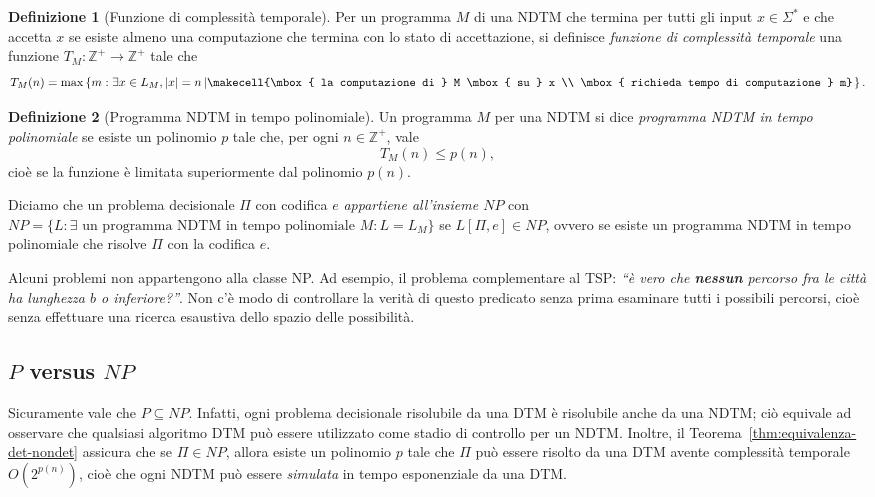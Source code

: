 \documentclass[10pt]{\classname}
\theoremstyle{newlinethm}
\theoremstyle{theorem}
\theoremstyle{definition}
\newtheorem{definizione}{Definizione}[section]
\theoremstyle{definition}
\theoremstyle{definition}
\theoremstyle{definition}
\begin{document}
\begin{definizione}[Funzione di complessità temporale]
    Per un programma $M$ di una NDTM che termina per tutti gli input $x \in \Sigma^*$ e che accetta $x$ se esiste almeno una computazione che termina con lo stato di accettazione, si definisce \emph{funzione di complessità temporale} una funzione $T_M : \mathbb Z^+ \rightarrow \mathbb Z^+$ tale che \[T_M(n) = \max \left\{m : \exists x \in L_M, |x| = n \left|\makecell{\mbox{ la computazione di } M \mbox{ su } x \\ \mbox{ richieda tempo di computazione } m}\right.\right\}.\]
\end{definizione}

\begin{definizione}[Programma NDTM in tempo polinomiale]
    Un programma $M$ per una NDTM si dice \emph{programma NDTM in tempo polinomiale} se esiste un polinomio $p$ tale che, per ogni $n \in \mathbb Z^+$, vale \[T_M(n) \leq p(n),\] cioè se la funzione è limitata superiormente dal polinomio $p(n)$.

    Diciamo che un problema decisionale $\Pi$ con codifica $e$ \emph{appartiene all'insieme $NP$} con $NP = \{L : \exists \mbox{ un programma NDTM in tempo polinomiale } M : L=L_M\}$ se $L[\Pi, e] \in NP$, ovvero se esiste un programma NDTM in tempo polinomiale che risolve $\Pi$ con la codifica $e$.
\end{definizione}

Alcuni problemi non appartengono alla classe NP. Ad esempio, il problema complementare al TSP: \emph{``è vero che \textbf{nessun} percorso fra le città ha lunghezza $b$ o inferiore?''}. Non c'è modo di controllare la verità di questo predicato senza prima esaminare tutti i possibili percorsi, cioè senza effettuare una ricerca esaustiva dello spazio delle possibilità.

\subsection{$P$ versus $NP$}

Sicuramente vale che $P \subseteq NP$. Infatti, ogni problema decisionale risolubile da una DTM è risolubile anche da una NDTM; ciò equivale ad osservare che qualsiasi algoritmo DTM può essere utilizzato come stadio di controllo per un NDTM. Inoltre, il Teorema~\ref{thm:equivalenza-det-nondet} assicura che se $\Pi \in NP$, allora esiste un polinomio $p$ tale che $\Pi$ può essere risolto da una DTM avente complessità temporale $O(2^{p(n)})$, cioè che ogni NDTM può essere \emph{simulata} in tempo esponenziale da una DTM.
\end{document}
